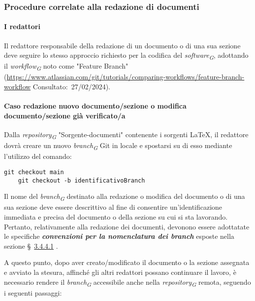 \subsubsection{Procedure correlate alla redazione di documenti} \label{subsubsec:ProcedureRedazioneDocumenti}

\hypertarget{par:Redattori}{\paragraph{I redattori}}
Il redattore responsabile della redazione di un documento o di una sua sezione deve seguire lo stesso approccio richiesto per la codifica del \textit{software}\textsubscript{\textit{G}}, adottando il \textit{workflow}\textsubscript{\textit{G}} noto come "Feature Branch" (\url{https://www.atlassian.com/git/tutorials/comparing-workflows/feature-branch-workflow} Consultato:~27/02/2024).

\paragraph*{\textbf{Caso redazione nuovo documento/sezione o modifica documento/sezione già verificato/a}}
Dalla \textit{repository}\textsubscript{\textit{G}} "Sorgente-documenti" contenente i sorgenti \LaTeX, il redattore dovrà creare un nuovo \textit{branch}\textsubscript{\textit{G}} Git in locale e spostarsi su di esso mediante l'utilizzo del comando:

\vspace{0.1cm}

\begin{lstlisting}[style=code]
    git checkout main
    git checkout -b identificativoBranch
\end{lstlisting}

Il nome del \textit{branch}\textsubscript{\textit{G}} destinato alla redazione o modifica del documento o di una sua sezione deve essere descrittivo al fine di consentire un'identificazione immediata e precisa del documento o della sezione su cui si sta lavorando. Pertanto, relativamente alla redazione dei documenti, devonono essere adottatate le specifiche \textit{\textbf{convenzioni per la nomenclatura dei branch}} esposte nella sezione \S~\hyperlink{par:convezioninomenclaturabranchdocumenti}{3.4.4.1} .

A questo punto, dopo aver creato/modificato il documento o la sezione assegnata e avviato la stesura, affinché gli altri redattori possano continuare il lavoro, è necessario rendere il \textit{branch}\textsubscript{\textit{G}} accessibile anche nella \textit{repository}\textsubscript{\textit{G}} remota, seguendo i seguenti passaggi:

